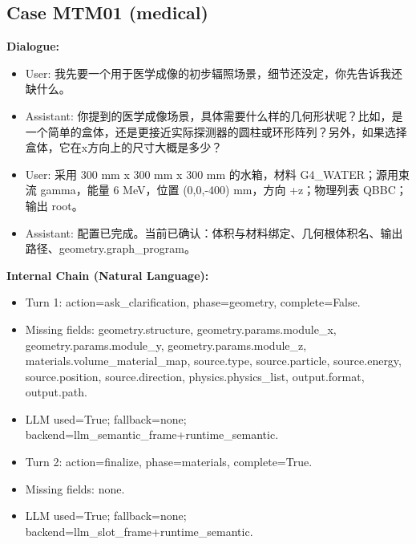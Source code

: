 \documentclass[11pt]{ctexart}
\begin{document}
\subsection{Case MTM01 (medical)}
\textbf{Dialogue:}
\begin{itemize}
\item User: 我先要一个用于医学成像的初步辐照场景，细节还没定，你先告诉我还缺什么。
\item Assistant: 你提到的医学成像场景，具体需要什么样的几何形状呢？比如，是一个简单的盒体，还是更接近实际探测器的圆柱或环形阵列？另外，如果选择盒体，它在x方向上的尺寸大概是多少？
\item User: 采用 300 mm x 300 mm x 300 mm 的水箱，材料 G4\_WATER；源用束流 gamma，能量 6 MeV，位置 (0,0,-400) mm，方向 +z；物理列表 QBBC；输出 root。
\item Assistant: 配置已完成。当前已确认：体积与材料绑定、几何根体积名、输出路径、geometry.graph\_program。
\end{itemize}
\textbf{Internal Chain (Natural Language):}
\begin{itemize}
\item Turn 1: action=ask\_clarification, phase=geometry, complete=False.
\item Missing fields: geometry.structure, geometry.params.module\_x, geometry.params.module\_y, geometry.params.module\_z, materials.volume\_material\_map, source.type, source.particle, source.energy, source.position, source.direction, physics.physics\_list, output.format, output.path.
\item LLM used=True; fallback=none; backend=llm\_semantic\_frame+runtime\_semantic.
\item Turn 2: action=finalize, phase=materials, complete=True.
\item Missing fields: none.
\item LLM used=True; fallback=none; backend=llm\_slot\_frame+runtime\_semantic.
\end{itemize}
\end{document}
